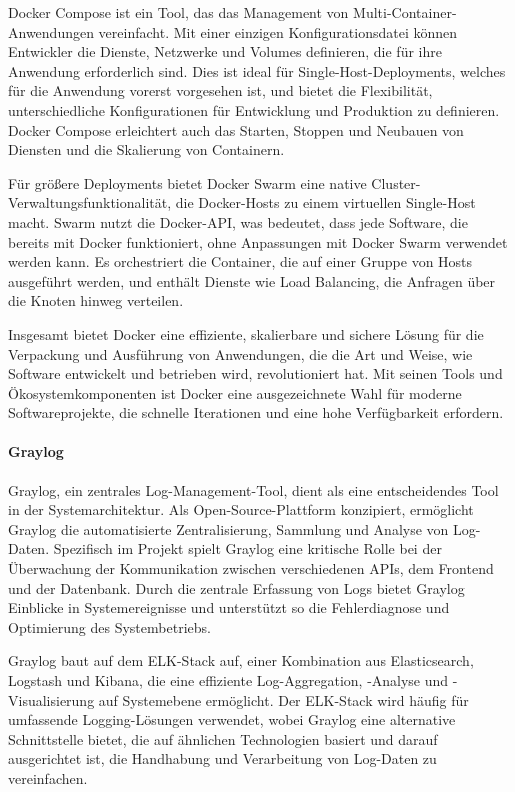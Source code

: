 Docker Compose ist ein Tool, das das Management von Multi-Container-Anwendungen vereinfacht. Mit einer einzigen Konfigurationsdatei können Entwickler die Dienste, Netzwerke und Volumes definieren, die für ihre Anwendung erforderlich sind. 
Dies ist ideal für Single-Host-Deployments, welches für die Anwendung vorerst vorgesehen ist, und bietet die Flexibilität, unterschiedliche Konfigurationen für Entwicklung und Produktion zu definieren. 
Docker Compose erleichtert auch das Starten, Stoppen und Neubauen von Diensten und die Skalierung von Containern.

Für größere Deployments bietet Docker Swarm eine native Cluster-Verwaltungsfunktionalität, die Docker-Hosts zu einem virtuellen Single-Host macht. 
Swarm nutzt die Docker-API, was bedeutet, dass jede Software, die bereits mit Docker funktioniert, ohne Anpassungen mit Docker Swarm verwendet werden kann. 
Es orchestriert die Container, die auf einer Gruppe von Hosts ausgeführt werden, und enthält Dienste wie Load Balancing, die Anfragen über die Knoten hinweg verteilen.

Insgesamt bietet Docker eine effiziente, skalierbare und sichere Lösung für die Verpackung und Ausführung von Anwendungen, 
die die Art und Weise, wie Software entwickelt und betrieben wird, revolutioniert hat. Mit seinen Tools und Ökosystemkomponenten ist Docker eine ausgezeichnete 
Wahl für moderne Softwareprojekte, die schnelle Iterationen und eine hohe Verfügbarkeit erfordern.



\paragraph{Graylog}
Graylog, ein zentrales Log-Management-Tool, dient als eine entscheidendes Tool in der Systemarchitektur.
Als Open-Source-Plattform konzipiert, ermöglicht Graylog die automatisierte Zentralisierung, Sammlung und Analyse von Log-Daten. 
Spezifisch im Projekt spielt Graylog eine kritische Rolle bei der Überwachung der Kommunikation zwischen verschiedenen APIs, dem Frontend und der Datenbank. 
Durch die zentrale Erfassung von Logs bietet Graylog Einblicke in Systemereignisse und unterstützt so die Fehlerdiagnose und Optimierung des Systembetriebs.

Graylog baut auf dem ELK-Stack auf, einer Kombination aus Elasticsearch, Logstash und Kibana, die eine effiziente Log-Aggregation, -Analyse und -Visualisierung auf Systemebene ermöglicht. 
Der ELK-Stack wird häufig für umfassende Logging-Lösungen verwendet, wobei Graylog eine alternative Schnittstelle bietet, die auf ähnlichen Technologien basiert 
und darauf ausgerichtet ist, die Handhabung und Verarbeitung von Log-Daten zu vereinfachen.

